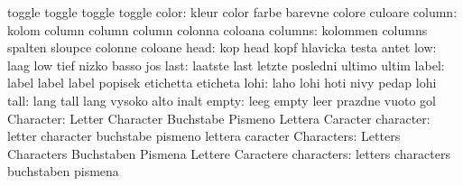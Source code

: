                            toggle                    toggle
                           toggle                    toggle
                    color: kleur                     color
                           farbe                     barevne
                           colore                    culoare
                   column: kolom                     column
                           column                    column
                           colonna                   coloana %
                  columns: kolommen                  columns
                           spalten                   sloupce
                           colonne                   coloane
                     head: kop                       head
                           kopf                      hlavicka
                           testa                     antet %
                      low: laag                      low
                           tief                      nizko
                           basso                     jos
                     last: laatste                   last
                           letzte                    posledni
                           ultimo                    ultim
                    label: label                     label
                           label                     popisek
                           etichetta                 eticheta
                     lohi: laho                      lohi
                           hoti                      nivy
                           pedap                     lohi %
                     tall: lang                      tall
                           lang                      vysoko
                           alto                      inalt %
                    empty: leeg                      empty
                           leer                      prazdne
                           vuoto                     gol
                Character: Letter                    Character
                           Buchstabe                 Pismeno
                           Lettera                   Caracter
                character: letter                    character
                           buchstabe                 pismeno
                           lettera                   caracter
               Characters: Letters                   Characters
                           Buchstaben                Pismena
                           Lettere                   Caractere
               characters: letters                   characters
                           buchstaben                pismena

